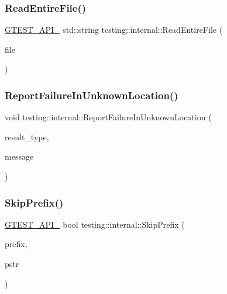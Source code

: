 \mbox{\label{namespacetesting_1_1internal_ab81b0af2a0131ea54dc11de00d5e6e51}} 
\subsubsection{\texorpdfstring{ReadEntireFile()}{ReadEntireFile()}}
{\footnotesize\ttfamily \mbox{\hyperlink{gtest-port_8h_aa73be6f0ba4a7456180a94904ce17790}{G\+T\+E\+S\+T\+\_\+\+A\+P\+I\+\_\+}} std\+::string testing\+::internal\+::\+Read\+Entire\+File (\begin{DoxyParamCaption}\item[{F\+I\+LE $\ast$}]{file }\end{DoxyParamCaption})}

\mbox{\label{namespacetesting_1_1internal_a85f6ff0e40f9a5f10af66a73cf1364fa}} 
\subsubsection{\texorpdfstring{ReportFailureInUnknownLocation()}{ReportFailureInUnknownLocation()}}
{\footnotesize\ttfamily void testing\+::internal\+::\+Report\+Failure\+In\+Unknown\+Location (\begin{DoxyParamCaption}\item[{\mbox{\hyperlink{classtesting_1_1_test_part_result_a65ae656b33fdfdfffaf34858778a52d5}{Test\+Part\+Result\+::\+Type}}}]{result\+\_\+type,  }\item[{const std\+::string \&}]{message }\end{DoxyParamCaption})}

\mbox{\label{namespacetesting_1_1internal_aac72b20299ad4a99554ce161e1769560}} 
\subsubsection{\texorpdfstring{SkipPrefix()}{SkipPrefix()}}
{\footnotesize\ttfamily \mbox{\hyperlink{gtest-port_8h_aa73be6f0ba4a7456180a94904ce17790}{G\+T\+E\+S\+T\+\_\+\+A\+P\+I\+\_\+}} bool testing\+::internal\+::\+Skip\+Prefix (\begin{DoxyParamCaption}\item[{const char $\ast$}]{prefix,  }\item[{const char $\ast$$\ast$}]{pstr }\end{DoxyParamCaption})}

